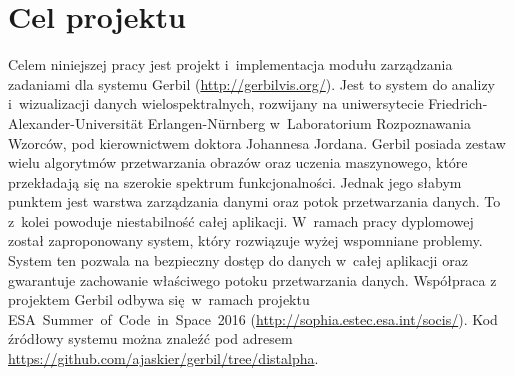 
\chapter{Cel projektu}

Celem niniejszej pracy jest projekt i~implementacja modułu zarządzania zadaniami dla systemu Gerbil (\url{http://gerbilvis.org/}). Jest to system do analizy i~wizualizacji danych wielospektralnych, rozwijany na uniwersytecie Friedrich-Alexander-Universit\"{a}t Erlangen-N\"{u}rnberg w~Laboratorium Rozpoznawania Wzorców, pod kierownictwem doktora Johannesa Jordana. Gerbil posiada zestaw wielu algorytmów przetwarzania obrazów oraz uczenia maszynowego, które przekładają się na szerokie spektrum funkcjonalności. Jednak jego słabym punktem jest warstwa zarządzania danymi oraz potok przetwarzania danych. To z~kolei powoduje niestabilność całej aplikacji. W~ramach pracy dyplomowej został zaproponowany system, który rozwiązuje wyżej wspomniane problemy. System ten pozwala na bezpieczny dostęp do danych w~całej aplikacji oraz gwarantuje zachowanie właściwego potoku przetwarzania danych. Współpraca z projektem Gerbil odbywa się w~ramach projektu \mbox{ESA Summer of Code in Space 2016} (\url{http://sophia.estec.esa.int/socis/}).
Kod źródłowy systemu można znaleźć pod adresem \url{https://github.com/ajaskier/gerbil/tree/distalpha}.
